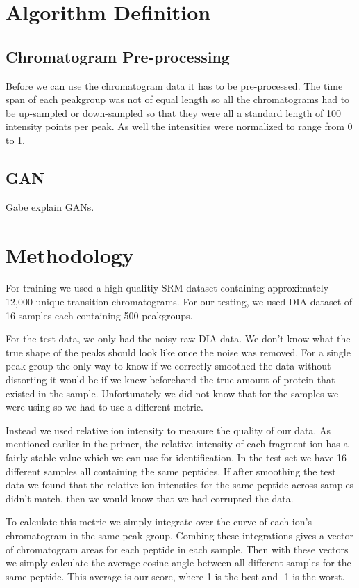 \documentclass[12pt]{article}
\begin{document}
\color{black}
\section{Algorithm Definition}
\subsection{Chromatogram Pre-processing}
Before we can use the chromatogram data it has to be pre-processed. The time span of each peakgroup was not of equal length so all the chromatograms had to be up-sampled or down-sampled so that they were all a standard length of 100 intensity points per peak. As well the intensities were normalized to range from 0 to 1.   
\subsection{GAN}
\color{red}
Gabe explain GANs.
\color{black}
\section{Methodology}
For training we used a high qualitiy SRM dataset\cite{Smooth_data} containing approximately 12,000 unique transition chromatograms. For our testing, we used DIA dataset \cite{TRIC} of 16 samples each containing 500 peakgroups.

For the test data, we only had the noisy raw DIA data. We don't know what the true shape of the peaks should look like once the noise was removed. For a single peak group the only way to know if we correctly smoothed the data without distorting it would be if we knew beforehand the true amount of protein that existed in the sample. Unfortunately we did not know that for the samples we were using so we had to use a different metric. 

Instead we used relative ion intensity to measure the quality of our data. As mentioned earlier in the primer, the relative intensity of each fragment ion has a fairly stable value which we can use for identification. In the test set we have 16 different samples all containing the same peptides. If after smoothing the test data we found that the relative ion intensties for the same peptide across samples didn't match, then we would know that we had corrupted the data. 

To calculate this metric we simply integrate over the curve of each ion's chromatogram in the same peak group. Combing these integrations gives a vector of chromatogram areas for each peptide in each sample. Then with these vectors we simply calculate the average cosine angle between all different samples for the same peptide. This average is our score, where 1 is the best and -1 is the worst.
\end{document}

